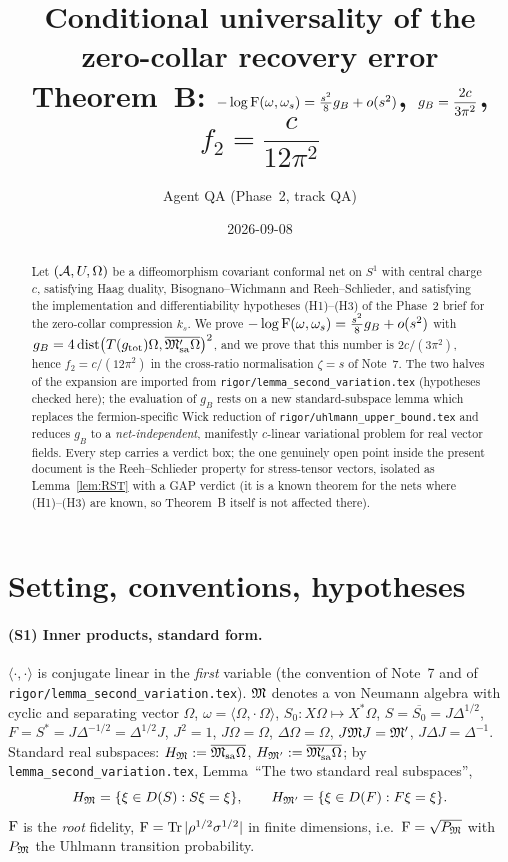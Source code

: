 \documentclass[11pt]{article}
\title{Conditional universality of the zero-collar recovery error\\[2pt]
\large Theorem~B: $-\log \Fid(\omega,\omega_s)=\tfrac{s^2}{8}\gB+o(s^2)$,\quad
$\gB=\dfrac{2c}{3\pi^2}$,\quad $f_2=\dfrac{c}{12\pi^2}$}
\author{Agent QA (Phase~2, track QA)}
\date{2026-09-08}
\newcommand{\Om}{\Omega}
\newcommand{\ip}[2]{\langle#1,#2\rangle}
\newcommand{\dist}{\operatorname{dist}}
\newcommand{\Msa}{\cM_{\mathrm{sa}}}
\newcommand{\Mpsa}{\cM'_{\mathrm{sa}}}
\newcommand{\HM}{H_{\cM}}
\newcommand{\HMp}{H_{\cM'}}
\newcommand{\gB}{g_B}
\newcommand{\gtot}{g_{\mathrm{tot}}}
\begin{document}
\maketitle
\begin{abstract}\noindent
Let $(\cA,U,\Om)$ be a diffeomorphism covariant conformal net on $S^1$ with central charge $c$, satisfying Haag
duality, Bisognano--Wichmann and Reeh--Schlieder, and satisfying the implementation and differentiability
hypotheses (H1)--(H3) of the Phase~2 brief for the zero-collar compression $k_s$.  We prove
$-\log\Fid(\omega,\omega_s)=\frac{s^2}8\gB+o(s^2)$ with
$\gB=4\dist\bigl(T(\gtot)\Om,\overline{\Mpsa\Om}\bigr)^2$, and we prove that this number is
$2c/(3\pi^2)$, hence $f_2=c/(12\pi^2)$ in the cross-ratio normalisation $\zeta=s$ of Note~7.
The two halves of the expansion are imported from \texttt{rigor/lemma\_second\_variation.tex}
(hypotheses checked here); the evaluation of $\gB$ rests on a new standard-subspace lemma which replaces the
fermion-specific Wick reduction of \texttt{rigor/uhlmann\_upper\_bound.tex} and reduces $\gB$ to a
\emph{net-independent}, manifestly $c$-linear variational problem for real vector fields.
Every step carries a verdict box; the one genuinely open point inside the present document is the
Reeh--Schlieder property for stress-tensor vectors, isolated as Lemma~\ref{lem:RST} with a GAP verdict
(it is a known theorem for the nets where (H1)--(H3) are known, so Theorem~B itself is not affected there).
\end{abstract}
\tableofcontents

\section{Setting, conventions, hypotheses}\label{sec:setting}

\paragraph{(S1) Inner products, standard form.}
$\ip\cdot\cdot$ is conjugate linear in the \emph{first} variable (the convention of Note~7 and of
\texttt{rigor/lemma\_second\_variation.tex}).  $\mathfrak M$ denotes a von Neumann algebra with cyclic and separating
vector $\Om$, $\omega=\ip\Om{\cdot\,\Om}$, $S_0:X\Om\mapsto X^*\Om$, $S=\overline{S_0}=J\Delta^{1/2}$,
$F=S^*=J\Delta^{-1/2}=\Delta^{1/2}J$, $J^2=1$, $J\Om=\Om$, $\Delta\Om=\Om$, $J\mathfrak M J=\mathfrak M'$, $J\Delta J=\Delta^{-1}$.
Standard real subspaces: $\HM:=\overline{\Msa\Om}$, $\HMp:=\overline{\Mpsa\Om}$; by
\texttt{lemma\_second\_variation.tex}, Lemma~``The two standard real subspaces'',
\begin{equation}\label{eq:realsub}
 \HM=\{\xi\in D(S):S\xi=\xi\},\qquad \HMp=\{\xi\in D(F):F\xi=\xi\} .
\end{equation}
$\operatorname{F}$ is the \emph{root} fidelity, $\operatorname{F}=\operatorname{Tr}|\rho^{1/2}\sigma^{1/2}|$ in finite dimensions, i.e.\
$\operatorname{F}=\sqrt{P_{\mathfrak M}}$ with $P_{\mathfrak M}$ the Uhlmann transition probability.
\end{document}
